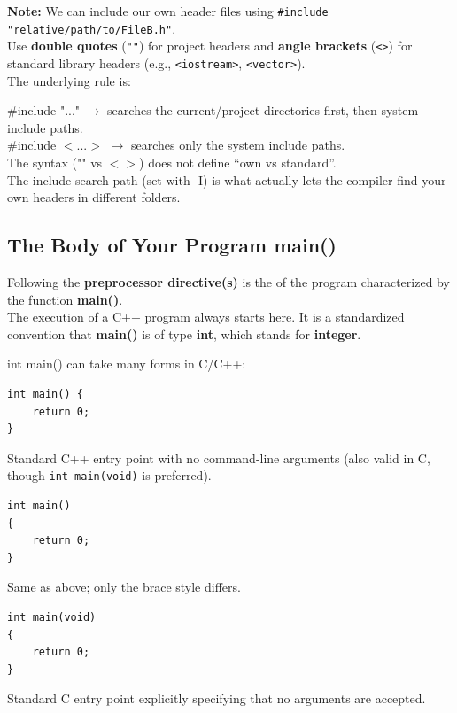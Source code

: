 \documentclass[10pt]{article}
\newcommand{\pbreak}{\vspace{30pt}}
\newcommand{\vocab}[1]{\fbox{\textbf{\textit{#1}}}}
\begin{document}
\pbreak 

\textbf{Note:} We can include our own header files using
\verb|#include "relative/path/to/FileB.h"|.\\
Use \textbf{double quotes} (\verb|""|) for project headers and \textbf{angle brackets} (\verb|<>|) for standard library headers (e.g., \verb|<iostream>|, \verb|<vector>|).\\ 

The underlying rule is:

\#include "..." $\rightarrow$ searches the current/project directories first, then system include paths.\\
\#include $<$...$>$ $\rightarrow$ searches only the system include paths.\\

The syntax ("" vs $<>$) does not define “own vs standard”.\\
The include search path (set with -I) is what actually lets the compiler find your own headers in different folders.

\newpage
\subsection{The Body of Your Program main()}
Following the \textbf{preprocessor directive(s)} is the \vocab{body} of the program characterized by the function \textbf{main()}.\\ 

The execution of a C++ program always starts here. It is a standardized convention that \textbf{main()} is of type \textbf{int}, which stands for \textbf{integer}.

\pbreak

int main() can take many forms in C/C++:

\begin{verbatim}
int main() {
    return 0;
}
\end{verbatim}
Standard C++ entry point with no command-line arguments (also valid in C, though \texttt{int main(void)} is preferred).

\begin{verbatim}
int main()
{
    return 0;
}
\end{verbatim}
Same as above; only the brace style differs.

\begin{verbatim}
int main(void)
{
    return 0;
}
\end{verbatim}
Standard C entry point explicitly specifying that no arguments are accepted.
\end{document}
